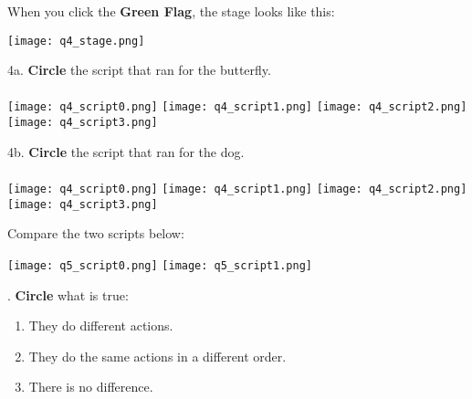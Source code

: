 \newpage
\noindent When you click the \textbf{Green Flag}, the stage looks like this:
\begin{center}
\texttt{[image: q4\_stage.png]}
\end{center}

\noindent 4a. \textbf{Circle} the script that ran for the butterfly. \\ \\
\texttt{[image: q4\_script0.png]} \hspace{1cm}
\texttt{[image: q4\_script1.png]} \hspace{1cm}
\texttt{[image: q4\_script2.png]} \hspace{1cm}
\texttt{[image: q4\_script3.png]} \hspace{1cm}
\vspace{1cm}


\noindent 4b. \textbf{Circle} the script that ran for the dog. \\ \\
\texttt{[image: q4\_script0.png]} \hspace{1cm}
\texttt{[image: q4\_script1.png]} \hspace{1cm}
\texttt{[image: q4\_script2.png]} \hspace{1cm}
\texttt{[image: q4\_script3.png]} \hspace{1cm}
\vspace{1cm}

\noindent \dotfill

\noindent Compare the two scripts below:
\begin{center}
\texttt{[image: q5\_script0.png]} \hspace{0.5in}
\texttt{[image: q5\_script1.png]}
\end{center}

. \textbf{Circle} what is true:
\renewcommand{\theenumi}{\Alph{enumi}}
\begin{enumerate}
\item They do different actions. 
\item They do the same actions in a different order.
\item There is no difference.
\end{enumerate}
\noindent \dotfill \\

\newpage